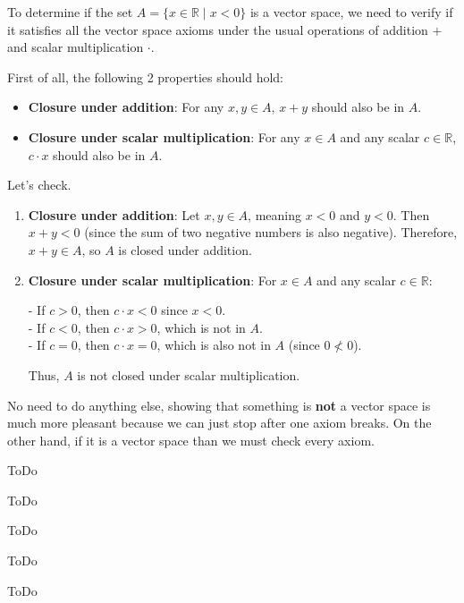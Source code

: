 \begin{sol}
    \begin{enumerate}
    {
        \item [a)]
    To determine if the set \( A = \{ x \in \mathbb{R} \mid x < 0 \} \) is a vector space, we need to verify if it satisfies all the vector space axioms under the usual operations of addition \( + \) and scalar multiplication \( \cdot \).

    First of all, the following 2 properties should hold:
    \begin{itemize}
        \item \textbf{Closure under addition}: For any \( x, y \in A \), \( x + y \) should also be in \( A \).
        
        \item \textbf{Closure under scalar multiplication}: For any \( x \in A \) and any scalar \( c \in \mathbb{R} \), \( c \cdot x \) should also be in \( A \).
    \end{itemize}

    Let's check.

    \begin{enumerate}
        \item \textbf{Closure under addition}: Let \( x, y \in A \), meaning \( x < 0 \) and \( y < 0 \). Then \( x + y < 0 \) (since the sum of two negative numbers is also negative). Therefore, \( x + y \in A \), so \( A \) is closed under addition.

        \item \textbf{Closure under scalar multiplication}: For \( x \in A \) and any scalar \( c \in \mathbb{R} \):
        
        - If \( c > 0 \), then \( c \cdot x < 0 \) since \( x < 0 \). \\
        - If \( c < 0 \), then \( c \cdot x > 0 \), which is not in \( A \). \\
        - If \( c = 0 \), then \( c \cdot x = 0 \), which is also not in \( A \) (since \( 0 \not< 0 \)).

        Thus, \( A \) is not closed under scalar multiplication.
    \end{enumerate}
    No need to do anything else, showing that something is \textbf{not} a vector space is much more pleasant because we can just stop after one axiom breaks. On the other hand, if it is a vector space than we must check every axiom.
    }

    \item[b)] ToDo
    \item[c)] ToDo
    \item[d)] ToDo
    \item[e)] ToDo
    \item[f)] ToDo
    
    \end{enumerate}
    
\end{sol}

